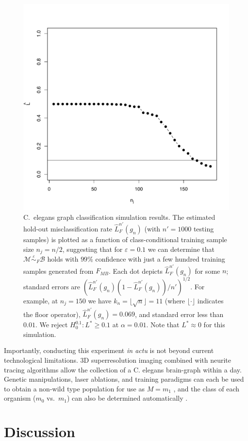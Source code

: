 \documentclass{article}
\newcommand{\mB}{\mathcal{B}}
\newcommand{\mM}{\mathcal{M}}
\newcommand{\PP}{\mathbb{P}}           %
\providecommand{\mt}[1]{\widetilde{#1}}
\newcommand{\hL}{\widehat{L}}
\newcommand{\MeB}{\mM \overset{\varepsilon}{{\sim}}_{F} \mB}
\begin{document}
\begin{figure}[!ht]
\centering 
\includegraphics[width=.5\linewidth]{Lhatplot}
\caption{C.~elegans graph classification simulation results.  The estimated hold-out misclassification rate $\hL^{n'}_{F}(g_{n})$  (with $n'=1000$ testing samples) %
is plotted as a function of class-conditional training sample size $n_j=n/2$, suggesting that for $\varepsilon=0.1$ we can determine that $\MeB$ holds with $99\%$ confidence with just a few hundred training samples generated from $F_{MB}$. Each dot depicts $\hL^{n'}_{F}(g_n)$ for some $n$; standard errors are $(\hL^{n'}_{F}(g_{n}) (1-\hL^{n'}_{F}(g_{n}))/n')^{1/2}$.  For example, at $n_j = 150$ we have $k_n = \lfloor\sqrt{n}\rfloor=11$ (where $\lfloor\cdot\rfloor$ indicates the floor operator), $\hL^{n'}_{F}(g_{n}) = 0.069$, and standard error less than $0.01$. We reject $H_0^{0.1}: L^* \geq 0.1$ at $\alpha=0.01$. Note that $L^* \approx 0$ for this simulation.}
\label{fig:1}
\end{figure}

Importantly, conducting this experiment {\it in actu} is not beyond current technological limitations. 3D superresolution imaging \cite{Vaziri2008} combined with neurite tracing algorithms \cite{Helmstaedter2008,Mishchenko09,LuLichtman09} allow the collection of a C. elegans brain-graph within a day. Genetic manipulations, laser ablations, and training paradigms can each be used to obtain a non-wild type population for use as $M=m_1$ \cite{deBonoMaricq05}, and the class of each organism ($m_0$ vs.~$m_1$) can also be determined automatically \cite{Buckingham2008}.





\section*{Discussion}
\end{document}
